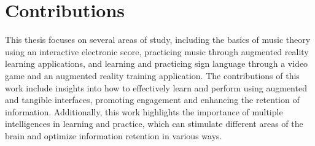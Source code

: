 \section{Contributions}

This thesis focuses on several areas of study, including the basics of music theory using an interactive electronic score, practicing music through augmented reality learning applications, and learning and practicing sign language through a video game and an augmented reality training application. 
The contributions of this work include insights into how to effectively learn and perform using augmented and tangible interfaces, promoting engagement and enhancing the retention of information. 
Additionally, this work highlights the importance of multiple intelligences in learning and practice, which can stimulate different areas of the brain and optimize information retention in various ways. 
